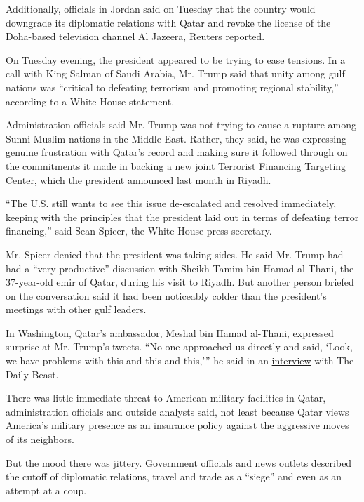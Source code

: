Additionally, officials in Jordan said on Tuesday that the country would
downgrade its diplomatic relations with Qatar and revoke the license of
the Doha-based television channel Al Jazeera, Reuters reported.

On Tuesday evening, the president appeared to be trying to ease
tensions. In a call with King Salman of Saudi Arabia, Mr. Trump said
that unity among gulf nations was ``critical to defeating terrorism and
promoting regional stability,'' according to a White House statement.

Administration officials said Mr. Trump was not trying to cause a
rupture among Sunni Muslim nations in the Middle East. Rather, they
said, he was expressing genuine frustration with Qatar's record and
making sure it followed through on the commitments it made in backing a
new joint Terrorist Financing Targeting Center, which the president
\href{https://www.nytimes.com/2017/05/21/world/middleeast/trump-saudi-arabia-islam-speech.html}{announced
last month} in Riyadh.

``The U.S. still wants to see this issue de-escalated and resolved
immediately, keeping with the principles that the president laid out in
terms of defeating terror financing,'' said Sean Spicer, the White House
press secretary.

Mr. Spicer denied that the president was taking sides. He said Mr. Trump
had had a ``very productive'' discussion with Sheikh Tamim bin Hamad
al-Thani, the 37-year-old emir of Qatar, during his visit to Riyadh. But
another person briefed on the conversation said it had been noticeably
colder than the president's meetings with other gulf leaders.

In Washington, Qatar's ambassador, Meshal bin Hamad al-Thani, expressed
surprise at Mr. Trump's tweets. ``No one approached us directly and
said, `Look, we have problems with this and this and this,''' he said in
an
\href{http://www.thedailybeast.com/qatar-ambassador-to-trump-whats-with-the-hate-tweets}{interview}
with The Daily Beast.

There was little immediate threat to American military facilities in
Qatar, administration officials and outside analysts said, not least
because Qatar views America's military presence as an insurance policy
against the aggressive moves of its neighbors.

But the mood there was jittery. Government officials and news outlets
described the cutoff of diplomatic relations, travel and trade as a
``siege'' and even as an attempt at a coup.

